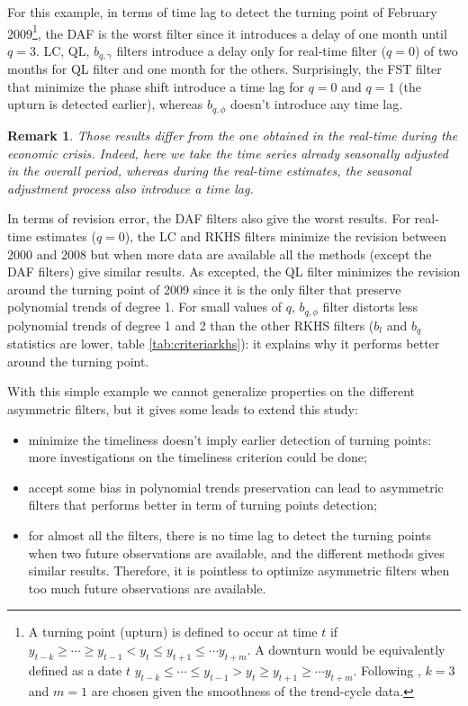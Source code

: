 \documentclass[
  12pt,
  ,
  a4paper]{article}
\newcommand\1{\mathds{1}}
\newtheorem*{remarque}{Remark}
\begin{document}
For this example, in terms of time lag to detect the turning point of February 2009\footnote{
  A turning point (upturn) is defined to occur at time \(t\) if \(y_{t-k}\geq\cdots\geq y_{t-1}<y_t\leq y_{t+1}\leq\cdots y_{t+m}\).
  A downturn would be equivalently defined as a date \(t\) \(y_{t-k}\leq\cdots\leq y_{t-1}>y_t\geq y_{t+1}\geq\cdots y_{t+m}\).
  Following \textcite{Zellner1991}, \(k=3\) and \(m=1\) are chosen given the smoothness of the trend-cycle data.}, the DAF is the worst filter since it introduces a delay of one month until \(q=3\).
LC, QL, \(b_{q,\gamma}\) filters introduce a delay only for real-time filter (\(q=0\)) of two months for QL filter and one month for the others.
Surprisingly, the FST filter that minimize the phase shift introduce a time lag for \(q=0\) and \(q=1\) (the upturn is detected earlier), whereas \(b_{q,\phi}\) doesn't introduce any time lag.

\begin{remarque}
Those results differ from the one obtained in the real-time during the economic crisis.
Indeed, here we take the time series already seasonally adjusted in the overall period, whereas during the real-time estimates, the seasonal adjustment process also introduce a time lag.

\end{remarque}

In terms of revision error, the DAF filters also give the worst results.
For real-time estimates (\(q=0\)), the LC and RKHS filters minimize the revision between 2000 and 2008 but when more data are available all the methods (except the DAF filters) give similar results.
As excepted, the QL filter minimizes the revision around the turning point of 2009 since it is the only filter that preserve polynomial trends of degree 1.
For small values of \(q\), \(b_{q,\phi}\) filter distorts less polynomial trends of degree 1 and 2 than the other RKHS filters (\(b_l\) and \(b_q\) statistics are lower, table \ref{tab:criteriarkhs}): it explains why it performs better around the turning point.

With this simple example we cannot generalize properties on the different asymmetric filters, but it gives some leads to extend this study:

\begin{itemize}
\item
  minimize the timeliness doesn't imply earlier detection of turning points: more investigations on the timeliness criterion could be done;
\item
  accept some bias in polynomial trends preservation can lead to asymmetric filters that performs better in term of turning points detection;
\item
  for almost all the filters, there is no time lag to detect the turning points when two future observations are available, and the different methods gives similar results.
  Therefore, it is pointless to optimize asymmetric filters when too much future observations are available.
\end{itemize}
\end{document}
